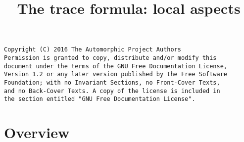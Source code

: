 

%

\newcommand{\TAG}{ZZZZ}

\title{The trace formula: local aspects}


\maketitle

\label{section-phantom}
\hypertarget{0600}{}
\reversemarginpar{}

\begin{verbatim}
Copyright (C) 2016 The Automorphic Project Authors
Permission is granted to copy, distribute and/or modify this
document under the terms of the GNU Free Documentation License,
Version 1.2 or any later version published by the Free Software
Foundation; with no Invariant Sections, no Front-Cover Texts,
and no Back-Cover Texts. A copy of the license is included in
the section entitled "GNU Free Documentation License".
\end{verbatim}

\tableofcontents


\section{Overview}
\label{section-overview}
\hypertarget{0601}{}
\reversemarginpar{}

\noindent









